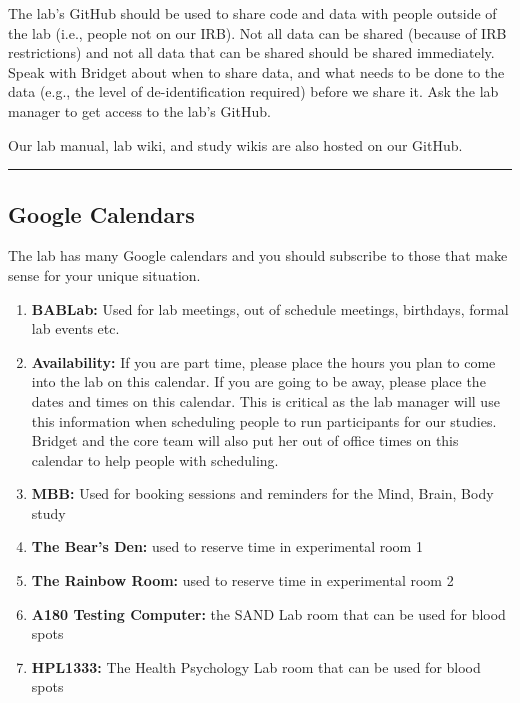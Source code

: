 \documentclass[
]{book}
\providecommand{\tightlist}{%
  \setlength{\itemsep}{0pt}\setlength{\parskip}{0pt}}
\begin{document}
The lab's GitHub should be used to share code and data with people outside of the lab (i.e., people not on our IRB). Not all data can be shared (because of IRB restrictions) and not all data that can be shared should be shared immediately. Speak with Bridget about when to share data, and what needs to be done to the data (e.g., the level of de-identification required) before we share it. Ask the lab manager to get access to the lab's GitHub.

Our lab manual, lab wiki, and study wikis are also hosted on our GitHub.

\begin{center}\rule{0.5\linewidth}{0.5pt}\end{center}

\hypertarget{google-calendars}{%
\subsection{Google Calendars}\label{google-calendars}}

The lab has many Google calendars and you should subscribe to those that make sense for your unique situation.

\begin{enumerate}
\def\labelenumi{\arabic{enumi}.}
\tightlist
\item
  \textbf{BABLab:} Used for lab meetings, out of schedule meetings, birthdays, formal lab events etc.
\item
  \textbf{Availability:} If you are part time, please place the hours you plan to come into the lab on this calendar. If you are going to be away, please place the dates and times on this calendar. This is critical as the lab manager will use this information when scheduling people to run participants for our studies. Bridget and the core team will also put her out of office times on this calendar to help people with scheduling.\\
\item
  \textbf{MBB:} Used for booking sessions and reminders for the Mind, Brain, Body study
\item
  \textbf{The Bear's Den:} used to reserve time in experimental room 1
\item
  \textbf{The Rainbow Room:} used to reserve time in experimental room 2
\item
  \textbf{A180 Testing Computer:} the SAND Lab room that can be used for blood spots
\item
  \textbf{HPL1333:} The Health Psychology Lab room that can be used for blood spots
\end{enumerate}
\end{document}
